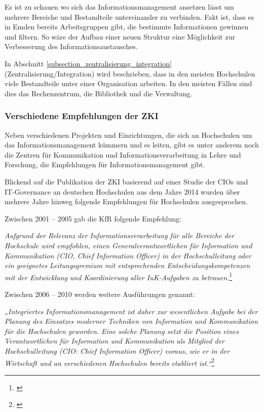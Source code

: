 Es ist zu schauen wo sich das Informationsmanagement ansetzen lässt um mehrere Bereiche und Bestandteile untereinander zu verbinden. Fakt ist, dass es in Emden bereits Arbeitsgruppen gibt, die bestimmte Informationen gewinnen und filtern. So wäre der Aufbau einer neuen Struktur eine Möglichkeit zur Verbesserung des Informationsaustausches.

In Abschnitt \ref{subsection_zentralisierung_integration} (Zentralisierung/Integration) wird beschrieben, dass in den meisten Hochschulen viele Bestandteile unter einer Organisation arbeiten. In den meisten Fällen sind dies das Rechenzentrum, die Bibliothek und die Verwaltung.

\subsubsection{Verschiedene Empfehlungen der ZKI}
Neben verschiedenen Projekten und Einrichtungen, die sich an Hochschulen um das 
Informationsmanagement kümmern und es leiten, gibt es unter anderem noch die Zentren 
für Kommunikation und Informationsverarbeitung in Lehre und Forschung, die Empfehlungen 
für Informationsmanagement gibt.

Blickend auf die Publikation der ZKI basierend auf einer Studie der CIOs und IT-Governance 
an deutschen Hochschulen aus dem Jahre 2014 wurden über mehrere Jahre hinweg folgende 
Empfehlungen für Hochschulen ausgesprochen.

Zwischen 2001 – 2005 gab die KfR folgende Empfehlung:

\textit{Aufgrund der Relevanz der Informationsverarbeitung für alle Bereiche der  Hochschule wird empfohlen, 
	einen Generalverantwortlichen für Information und  Kommunikation (CIO, Chief Information Officer) 
	in der Hochschulleitung oder ein geeignetes Leitungsgremium mit entsprechenden 
	Entscheidungskompetenzen mit der Entwicklung und  Koordinierung aller IuK-Aufgaben 
	zu betrauen.}\footnote{\cite[3]{lang_cios_2014}}

Zwischen 2006 – 2010 werden weitere Ausführungen genannt:

\textit{„Integriertes Informationsmanagement ist daher zur wesentlichen Aufgabe bei der Planung des 
	Einsatzes moderner Techniken von Information und Kommunikation für die Hochschulen geworden. 
	Eine solche Planung setzt die Position eines Verantwortlichen für Information und Kommunikation 
	als Mitglied der Hochschulleitung (CIO: Chief Information Officer) voraus, wie er in der Wirtschaft 
	und an verschiedenen Hochschulen bereits etabliert ist.“}\footnote{\cite[16]{lang_cios_2014}}

